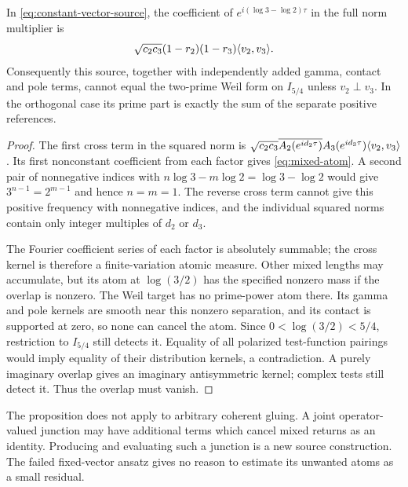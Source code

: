 \begin{proposition}\label{prop:mixed}
In \eqref{eq:constant-vector-source}, the coefficient of
$e^{i(\log3-\log2)\tau}$ in the full norm multiplier is
\begin{equation}\label{eq:mixed-atom}
 \sqrt{c_2c_3}(1-r_2)(1-r_3)\langle v_2,v_3\rangle.
\end{equation}
Consequently this source, together with independently added gamma,
contact and pole terms, cannot equal the two-prime Weil form on
$I_{5/4}$ unless $v_2\perp v_3$. In the orthogonal case its prime
part is exactly the sum of the separate positive references.
\end{proposition}
\begin{proof}
The first cross term in the squared norm is
$\sqrt{c_2c_3}\overline{A_2(e^{id_2\tau})}
A_3(e^{id_3\tau})\langle v_2,v_3\rangle$.
Its first nonconstant coefficient from each factor gives
\eqref{eq:mixed-atom}. A second pair of nonnegative indices with
$n\log3-m\log2=\log3-\log2$ would give
$3^{n-1}=2^{m-1}$ and hence $n=m=1$. The reverse cross term cannot
give this positive frequency with nonnegative indices, and the
individual squared norms contain only integer multiples of $d_2$
or $d_3$.

The Fourier coefficient series of each factor is absolutely summable;
the cross kernel is therefore a finite-variation atomic measure. Other
mixed lengths may accumulate, but its atom at $\log(3/2)$ has the
specified nonzero mass if the overlap is nonzero. The Weil target has
no prime-power atom there. Its gamma and pole kernels are smooth near
this nonzero separation, and its contact is supported at zero, so none
can cancel the atom. Since $0<\log(3/2)<5/4$, restriction to $I_{5/4}$
still detects it. Equality of all polarized test-function pairings
would imply equality of their distribution kernels, a contradiction.
A purely imaginary overlap gives an imaginary antisymmetric kernel;
complex tests still detect it. Thus the overlap must vanish.
\end{proof}

The proposition does not apply to arbitrary coherent gluing. A joint
operator-valued junction may have additional terms which cancel mixed
returns as an identity. Producing and evaluating such a junction is a
new source construction. The failed fixed-vector ansatz gives no reason
to estimate its unwanted atoms as a small residual.

